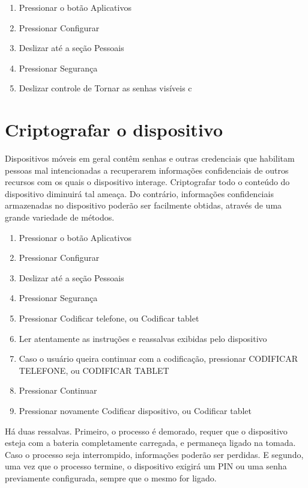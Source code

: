 \begin{enumerate}
\item Pressionar o bot\~ao Aplicativos
\item Pressionar Configurar
\item Deslizar at\'e a se\c c\~ao Pessoais
\item Pressionar Seguran\c ca
\item Deslizar controle de Tornar as senhas vis\'iveis c	
\end{enumerate}

\section{Criptografar o dispositivo}

Dispositivos m\'oveis em geral cont\^em senhas e outras credenciais que habilitam pessoas mal intencionadas a recuperarem informa\c c\~oes confidenciais de outros recursos com os quais o dispositivo interage. Criptografar todo o conte\'udo do dispositivo diminuir\'a tal amea\c ca. Do contr\'ario, informa\c c\~oes confidenciais armazenadas no dispositivo poder\~ao ser facilmente obtidas, atrav\'es de uma grande variedade de m\'etodos.

\begin{enumerate}
\item Pressionar o bot\~ao Aplicativos
\item Pressionar Configurar
\item Deslizar at\'e a se\c c\~ao Pessoais
\item Pressionar Seguran\c ca
\item Pressionar Codificar telefone, ou Codificar tablet
\item Ler atentamente as instru\c c\~oes e reassalvas exibidas pelo dispositivo
\item Caso o usu\'ario queira continuar com a codifica\c c\~ao, pressionar CODIFICAR TELEFONE, ou CODIFICAR TABLET
\item Pressionar Continuar
\item Pressionar novamente Codificar dispositivo, ou Codificar tablet
\end{enumerate}

H\'a duas ressalvas. Primeiro, o processo \'e demorado, requer que o dispositivo esteja com a bateria completamente carregada, e permane\c ca ligado na tomada. Caso o processo seja interrompido, informa\c c\~oes poder\~ao ser perdidas. E segundo, uma vez que o processo termine, o dispositivo exigir\'a um PIN ou uma senha previamente configurada, sempre que o mesmo for ligado.

